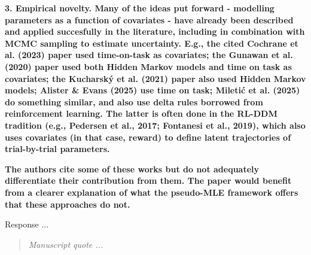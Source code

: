 \documentclass[00-main.tex]{subfiles}
\newcommand{\reviewercomment}[1]{\vspace{0.3cm}\noindent\textbf{#1}\vspace{0.15cm}}
\newcommand{\manuscriptquote}[1]{\begin{quote}\textit{#1}\end{quote}}
\begin{document}
\reviewercomment{3. Empirical novelty. Many of the ideas put forward - modelling parameters as a function of covariates - have already been described and applied succesfully in the literature, including in combination with MCMC sampling to estimate uncertainty. E.g., the cited Cochrane et al. (2023) paper used time-on-task as covariates; the Gunawan et al. (2020) paper used both Hidden Markov models and time on task as covariates; the Kucharský et al. (2021) paper also used Hidden Markov models; Alister \& Evans (2025) use time on task; Miletić et al. (2025) do something similar, and also use delta rules borrowed from reinforcement learning. The latter is often done in the RL-DDM tradition (e.g., Pedersen et al., 2017; Fontanesi et al., 2019), which also uses covariates (in that case, reward) to define latent trajectories of trial-by-trial parameters.}

\reviewercomment{The authors cite some of these works but do not adequately differentiate their contribution from them. The paper would benefit from a clearer explanation of what the pseudo-MLE framework offers that these approaches do not.}

Response ...

\manuscriptquote{Manuscript quote ...}
\end{document}
